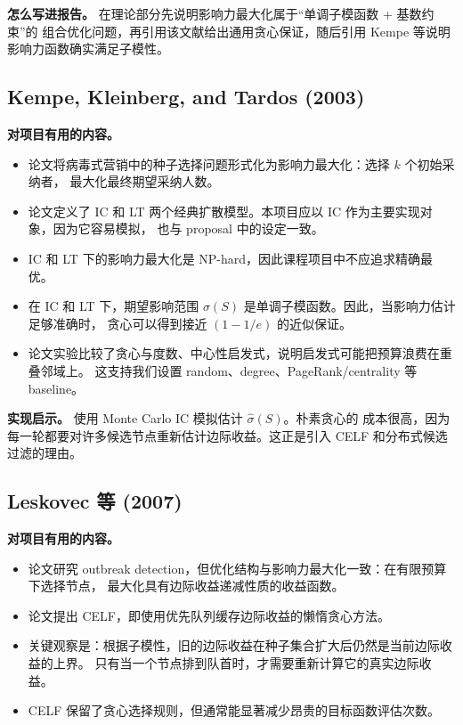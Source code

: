 \documentclass[UTF8,10pt]{ctexart}
\begin{document}
\textbf{怎么写进报告。} 在理论部分先说明影响力最大化属于“单调子模函数 + 基数约束”的
组合优化问题，再引用该文献给出通用贪心保证，随后引用 Kempe 等说明影响力函数确实满足子模性。

\subsection{Kempe, Kleinberg, and Tardos (2003)}

\textbf{对项目有用的内容。}
\begin{itemize}
\item 论文将病毒式营销中的种子选择问题形式化为影响力最大化：选择 $k$ 个初始采纳者，
最大化最终期望采纳人数。
\item 论文定义了 IC 和 LT 两个经典扩散模型。本项目应以 IC 作为主要实现对象，因为它容易模拟，
也与 proposal 中的设定一致。
\item IC 和 LT 下的影响力最大化是 NP-hard，因此课程项目中不应追求精确最优。
\item 在 IC 和 LT 下，期望影响范围 $\sigma(S)$ 是单调子模函数。因此，当影响力估计足够准确时，
贪心可以得到接近 $(1-1/e)$ 的近似保证。
\item 论文实验比较了贪心与度数、中心性启发式，说明启发式可能把预算浪费在重叠邻域上。
这支持我们设置 random、degree、PageRank/centrality 等 baseline。
\end{itemize}

\textbf{实现启示。} 使用 Monte Carlo IC 模拟估计 $\widehat{\sigma}(S)$。朴素贪心的
成本很高，因为每一轮都要对许多候选节点重新估计边际收益。这正是引入 CELF 和分布式候选
过滤的理由。

\subsection{Leskovec 等 (2007)}

\textbf{对项目有用的内容。}
\begin{itemize}
\item 论文研究 outbreak detection，但优化结构与影响力最大化一致：在有限预算下选择节点，
最大化具有边际收益递减性质的收益函数。
\item 论文提出 CELF，即使用优先队列缓存边际收益的懒惰贪心方法。
\item 关键观察是：根据子模性，旧的边际收益在种子集合扩大后仍然是当前边际收益的上界。
只有当一个节点排到队首时，才需要重新计算它的真实边际收益。
\item CELF 保留了贪心选择规则，但通常能显著减少昂贵的目标函数评估次数。
\end{itemize}
\end{document}
